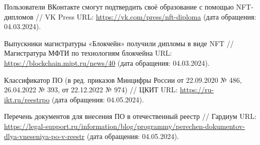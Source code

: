 \begin{thebibliography}{99\kern\bibindent}
	 Пользователи ВКонтакте смогут подтвердить своё образование с помощью NFT-дипломов // VK Press URL: \url{https://vk.com/press/nft-diploma} (дата обращения: 04.03.2024).

	 Выпускники магистратуры «Блокчейн» получили дипломы в виде NFT // Магистратура МФТИ по технологиям блокчейна URL: \url{https://blockchain.mipt.ru/news/40} (дата обращения: 04.03.2024).

	\begin{comment}
	\bibitem{bib:func_and_nf_req} Самое полное руководство по управлению требованиями и отслеживаемости // Visure Solutions URL: \url{https://visuresolutions.com/ru/requirements-management-traceability-guide/functional-vs-non-functional-requirements} (дата обращения: 07.04.2024).

	\bibitem{bib:app_req} Определение требований к программному обеспечению  // Narod.ru URL: \url{https://chaox-dump.narod.ru/ooap/ooapl6.html} (дата обращения: 07.04.2024).

	\bibitem{bib:152fz} Федеральный закон от 27.07.2006 г. № 152-ФЗ // Kremlin.ru URL: \url{http://kremlin.ru/acts/bank/24154} (дата обращения: 07.04.2024).
	
	\bibitem{bib:sc_abi} Финогеев А. Г., Васин С. М., Гамидуллаева Л. А., Финогеев А. А. // Технология смарт контрактов на основе блокчейн для минимизации трансакционных издержек в региональных инновационных системах // Вопросы безопасности. 2018. №3: 46-48. %

	\bibitem{bib:ipfs_is} IPFS вместо HTTP — будущее децентрализованного интернета // ForkLog URL: \url{https://forklog.com/cryptorium/chto-takoe-ipfs} (дата обращения: 07.04.2024).
	\end{comment}

	 Классификатор ПО (в ред. приказов Минцифры России от 22.09.2020 № 486, 26.04.2022 № 393, от 22.12.2022 № 974) // ЦКИТ URL: \url{https://ru-ikt.ru/reestrpo} (дата обращения: 04.05.2024).

	 Перечень документов для внесения ПО в отечественный реестр // Гардиум URL: \url{https://legal-support.ru/information/blog/programmy/perechen-dokumentov-dlya-vneseniya-po-v-reestr} (дата обращения: 04.05.2024).


\end{thebibliography}
